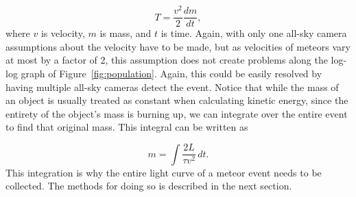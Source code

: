 \begin{equation}
	T = \frac{v^2}{2}\frac{dm}{dt},
\end{equation}
where $v$ is velocity, $m$ is mass, and $t$ is time. Again, with only one all-sky camera assumptions about the velocity have to be made, but as velocities of meteors vary at most by a factor of 2, this assumption does not create problems along the log-log graph of Figure~\ref{fig:population}. Again, this could be easily resolved by having multiple all-sky cameras detect the event. Notice that while the mass of an object is usually treated as constant when calculating kinetic energy, since the entirety of the object's mass is burning up, we can integrate over the entire event to find that original mass. This integral can be written as

\begin{equation}
m =\int \frac{2L}{\tau v^2}\,dt.
\end{equation}
This integration is why the entire light curve of a meteor event needs to be collected. The methods for doing so is described in the next section.
